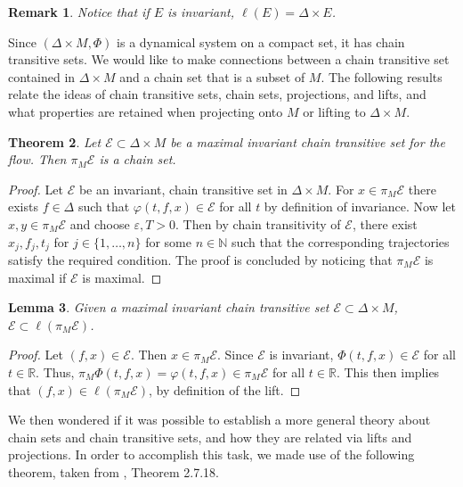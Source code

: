 \documentclass[11pt]{article}
\newtheorem{thm}{Theorem}
\newtheorem{lem}[thm]{Lemma}
\newtheorem{remark}[thm]{Remark}
\begin{document}
\begin{remark}
Notice that if $E$ is invariant, $\ell(E)=\Delta\times E$. 
\end{remark}

Since $(\Delta\times M,\Phi)$ is a dynamical system on a compact set, it has chain transitive sets.  We would like to make connections between a chain transitive set contained in $\Delta\times M$ and a chain set that is a subset of $M$.  The following results relate the ideas of chain transitive sets, chain sets, projections, and lifts, and what properties are retained when projecting onto $M$ or lifting to $\Delta\times M$. 



\begin{thm}\label{max chain set}
Let $\mathcal{E}\subset \Delta\times M$ be a maximal invariant chain transitive set for the flow.  Then $\pi_M\mathcal{E}$ is a chain set.
\end{thm}
\begin{proof}
Let $\mathcal{E}$ be an invariant, chain transitive set in $\Delta\times M$.  For $x\in\pi_M\mathcal{E}$ there exists $f\in\Delta$ such that $\varphi(t,f,x)\in\mathcal{E}$ for all $t$ by definition of invariance.  Now let $x,y\in \pi_M\mathcal{E}$ and choose $\varepsilon, T>0$.  Then by chain transitivity of $\mathcal{E}$, there exist $x_j, f_j, t_j$ for $j\in\{1,\ldots,n\}$ for some $n\in\mathbb{N}$ such that the corresponding trajectories satisfy the required condition.  The proof is concluded by noticing that $\pi_M\mathcal{E}$ is maximal if $\mathcal{E}$ is maximal.

\end{proof}

\begin{lem}\label{chain set subset}
Given a maximal invariant chain transitive set $\mathcal{E}\subset \Delta\times M$, $\mathcal{E}\subset\ell(\pi_M\mathcal{E})$.
\end{lem}
\begin{proof}
Let $(f,x)\in\mathcal{E}$.  Then $x\in \pi_M\mathcal{E}$.  Since $\mathcal{E}$ is invariant, $\Phi(t,f,x)\in \mathcal{E}$ for all $t\in\mathbb{R}$.  Thus, $\pi_M\Phi(t,f,x)=\varphi(t,f,x)\in\pi_M\mathcal{E}$ for all $t\in\mathbb{R}$.  This then implies that $(f,x)\in\ell(\pi_M\mathcal{E})$, by definition of the lift. 
\end{proof}


We then wondered if it was possible to establish a more general theory about chain sets and chain transitive sets, and how they are related via lifts and projections.  In order to accomplish this task, we made use of the following theorem, taken from \cite{Alongi}, Theorem 2.7.18.
\end{document}
